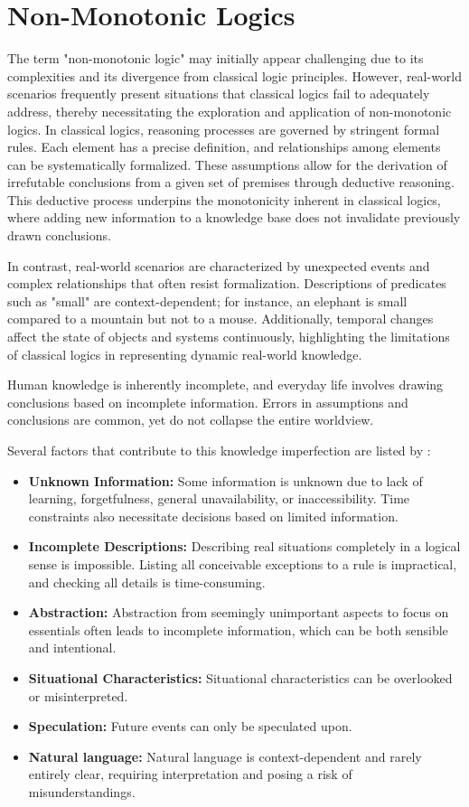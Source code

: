 \section{Non-Monotonic Logics}
The term "non-monotonic logic" may initially appear challenging due to its complexities and its divergence from classical logic principles.
However, real-world scenarios frequently present situations that classical logics fail to adequately address, thereby necessitating the exploration and application of non-monotonic logics.
In classical logics, reasoning processes are governed by stringent formal rules.
Each element has a precise definition, and relationships among elements can be systematically formalized.
These assumptions allow for the derivation of irrefutable conclusions from a given set of premises through deductive reasoning.
This deductive process underpins the monotonicity inherent in classical logics, where adding new information to a knowledge base does not invalidate previously drawn conclusions.

In contrast, real-world scenarios are characterized by unexpected events and complex relationships that often resist formalization.
Descriptions of predicates such as "small" are context-dependent; for instance, an elephant is small compared to a mountain but not to a mouse.
Additionally, temporal changes affect the state of objects and systems continuously, highlighting the limitations of classical logics in representing dynamic real-world knowledge.

Human knowledge is inherently incomplete, and everyday life involves drawing conclusions based on incomplete information.
Errors in assumptions and conclusions are common, yet do not collapse the entire worldview.

Several factors that contribute to this knowledge imperfection are listed by \cite{beierle_methoden_2019}:
\begin{itemize}
      \item \textbf{Unknown Information:} Some information is unknown due to lack of learning, forgetfulness, general unavailability, or inaccessibility.
            Time constraints also necessitate decisions based on limited information.
      \item \textbf{Incomplete Descriptions:} Describing real situations completely in a logical sense is impossible.
            Listing all conceivable exceptions to a rule is impractical, and checking all details is time-consuming.
      \item \textbf{Abstraction:} Abstraction from seemingly unimportant aspects to focus on essentials often leads to incomplete information, which can be both sensible and intentional.
      \item \textbf{Situational Characteristics:} Situational characteristics can be overlooked or misinterpreted.
      \item \textbf{Speculation:} Future events can only be speculated upon.
      \item \textbf{Natural language:} Natural language is context-dependent and rarely entirely clear, requiring interpretation and posing a risk of misunderstandings.
\end{itemize}

